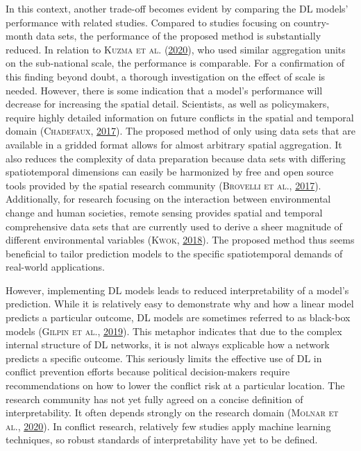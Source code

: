 \documentclass[a4paper,11pt]{article}
\begin{document}
In this context, another trade-off becomes evident by comparing the DL models'
performance with related studies. Compared to studies focusing on country-month
data sets, the performance of the proposed method is substantially reduced. In
relation to \textsc{\textnormal{Kuzma} \textnormal{et al.}} \textsc{(\textnormal{\protect\hyperlink{ref-kuzma2020}{2020}})}, who used similar aggregation units on the sub-national
scale, the performance is comparable. For a confirmation of this finding beyond
doubt, a thorough investigation on the effect of scale is needed. However, there
is some indication that a model's performance will decrease for increasing the spatial
detail. Scientists, as well as policymakers, require highly detailed information
on future conflicts in the spatial and temporal domain \textsc{(\textnormal{\textsc{Chadefaux}}, \textnormal{\protect\hyperlink{ref-chadefaux2017}{2017}})}. The
proposed method of only using data sets that are available in a gridded format
allows for almost arbitrary spatial aggregation. It also reduces the complexity
of data preparation because data sets with differing spatiotemporal dimensions
can easily be harmonized by free and open source tools provided by the spatial
research community \textsc{(\textnormal{\textsc{Brovelli} \textsc{et al.}}, \textnormal{\protect\hyperlink{ref-brovelli2017}{2017}})}. Additionally, for research focusing on the
interaction between environmental change and human societies, remote sensing
provides spatial and temporal comprehensive data sets that are currently used to
derive a sheer magnitude of different environmental variables \textsc{(\textnormal{\textsc{Kwok}}, \textnormal{\protect\hyperlink{ref-kwok2018}{2018}})}. The
proposed method thus seems beneficial to tailor prediction models to the specific
spatiotemporal demands of real-world applications.

However, implementing DL models leads to reduced interpretability of a model's
prediction. While it is relatively easy to demonstrate why and how a linear model
predicts a particular outcome, DL models are sometimes referred to as black-box models \textsc{(\textnormal{\textsc{Gilpin} \textsc{et al.}}, \textnormal{\protect\hyperlink{ref-gilpin2019}{2019}})}.
This metaphor indicates that due to the complex internal structure of DL networks,
it is not always explicable how a network predicts a specific outcome. This seriously
limits the effective use of DL in conflict prevention efforts because political
decision-makers require recommendations on how to lower the conflict risk
at a particular location. The research community has not yet fully agreed on a
concise definition of interpretability. It often depends strongly on the
research domain \textsc{(\textnormal{\textsc{Molnar} \textsc{et al.}}, \textnormal{\protect\hyperlink{ref-molnar2020}{2020}})}. In conflict research, relatively few studies apply
machine learning techniques, so robust standards of interpretability
have yet to be defined.
\end{document}
